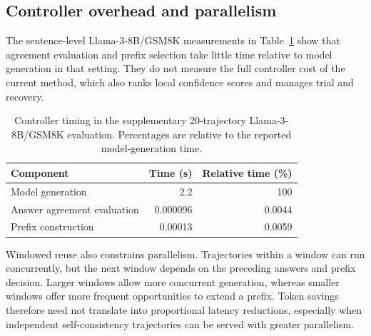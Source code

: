 \subsection{Controller overhead and parallelism}
The sentence-level Llama-3-8B/GSM8K measurements in Table~\ref{tab:sentence_overhead} show that agreement evaluation and prefix selection take little time relative to model generation in that setting. They do not measure the full controller cost of the current method, which also ranks local confidence scores and manages trial and recovery.

\begin{table}[!htbp]
\centering\small
\caption{Controller timing in the supplementary 20-trajectory Llama-3-8B/GSM8K evaluation. Percentages are relative to the reported model-generation time.}
\label{tab:sentence_overhead}
\begin{tabular}{@{}lrr@{}}
\toprule
Component & Time (s) & Relative time (\%)\\
\midrule
Model generation & 2.2 & 100\\
Answer agreement evaluation & 0.000096 & 0.0044\\
Prefix construction & 0.00013 & 0.0059\\
\bottomrule
\end{tabular}
\end{table}

Windowed reuse also constrains parallelism. Trajectories within a window can run concurrently, but the next window depends on the preceding answers and prefix decision. Larger windows allow more concurrent generation, whereas smaller windows offer more frequent opportunities to extend a prefix. Token savings therefore need not translate into proportional latency reductions, especially when independent self-consistency trajectories can be served with greater parallelism.

